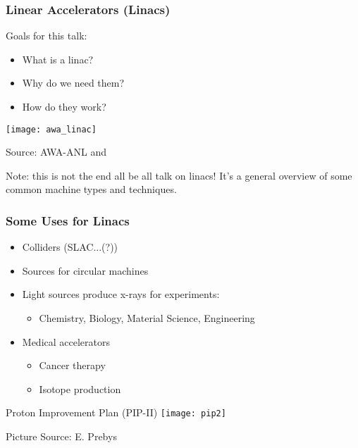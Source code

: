 \documentclass[professionalfonts,t]{beamer}
\begin{document}
\begin{frame}
	\frametitle{Linear Accelerators (Linacs)}
	
	\vspace{1em}
	Goals for this talk:
	
	\begin{minipage}{0.43\textwidth}
		\begin{itemize}
			\item What is a linac?
			\item Why do we need them?
			\item How do they work?
		\end{itemize}
	\end{minipage}
\begin{minipage}{0.55\textwidth}
	\centering
	\texttt{[image: awa\_linac]}
	
	Source: AWA-ANL and 
\end{minipage}

\vspace{1em}
Note: this is not the end all be all talk on linacs!
It's a general overview of some common machine types and techniques.

\end{frame}

\begin{frame}
\frametitle{Some Uses for Linacs}
\vspace{-0.5em}
\begin{minipage}{0.45\textwidth}
	\begin{itemize}
		\item Colliders (SLAC...(?))
		\item Sources for circular machines
		\item Light sources produce x-rays for experiments:
		\begin{itemize}
			\item Chemistry, Biology, Material Science, Engineering
		\end{itemize}
		\item Medical accelerators 
		\begin{itemize}
			\item Cancer therapy 
			\item Isotope production
		\end{itemize}
	\end{itemize}
\end{minipage}\hfill
\begin{minipage}{0.5\textwidth}
	\centering
	\vspace{-1.25em}
	
	\small Proton Improvement Plan (PIP-II)
	\texttt{[image: pip2]}
	
	\vspace{-0.25em}
	Picture Source: E. Prebys
\end{minipage}
\end{frame}
\end{document}
